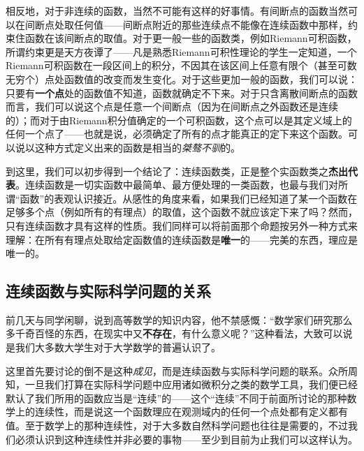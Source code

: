 \documentclass[12pt,a4paper]{article}
\begin{document}
{			相反地，对于非连续的函数，当然不可能有这样的好事情。有间断点的函数当然可以在间断点处取任何值——间断点附近的那些连续点不能像在连续函数中那样，约束住函数在该间断点的取值。对于更一般一些的函数类，例如Riemann可积函数，所谓约束更是天方夜谭了——凡是熟悉Riemann可积性理论的学生一定知道，一个Riemann可积函数在一段区间上的积分，不因其在该区间上任意有限个（甚至可数无穷个）点处函数值的改变而发生变化。对于这些更加一般的函数，我们可以说：只要有{\bfseries 一个点}处的函数值不知道，函数就确定不下来。对于只含离散间断点的函数而言，我们可以说这个点是任意一个间断点（因为在间断点之外函数还是连续的）；而对于由Riemann积分值确定的一个可积函数，这个点可以是其定义域上的任何一个点了——也就是说，必须确定了所有的点才能真正的定下来这个函数。可以说以这种方式定义出来的函数是相当的{\itshape 桀骜不驯}的。
			
			到这里，我们可以初步得到一个结论了：连续函数类，正是整个实函数类之{\bfseries 杰出代表}。连续函数是一切实函数中最简单、最方便处理的一类函数，也最与我们对所谓“函数”的表观认识接近。从感性的角度来看，如果我们已经知道了某一个函数在足够多个点（例如所有的有理点）的取值，这个函数不就应该定下来了吗？然而，只有连续函数才具有这样的性质。我们同样可以将前面那个命题按另外一种方式来理解：在所有有理点处取给定函数值的连续函数是{\bfseries 唯一}的——完美的东西，理应是唯一的。
		
		\subsection{连续函数与实际科学问题的关系}{
			前几天与同学闲聊，说到高等数学的知识内容，他不禁感慨：“数学家们研究那么多千奇百怪的东西，在现实中又{\bfseries 不存在}，有什么意义呢？”这种看法，大致可以说是我们大多数大学生对于大学数学的普遍认识了。
		
			这里首先要讨论的倒不是这种{\itshape 成见}，而是连续函数与实际科学问题的联系。众所周知，一旦我们打算在实际科学问题中应用诸如微积分之类的数学工具，我们便已经默认了我们所用的函数应当是“连续”的——这个“连续”不同于前面所讨论的那种数学上的连续性，而是说这一个函数理应在观测域内的任何一个点处都有定义都有值。至于数学上的那种连续性，对于大多数自然科学问题也往往是需要的，不过我们必须认识到这种连续性并非必要的事物——至少到目前为止我们可以这样认为。
			
}}
\end{document}

